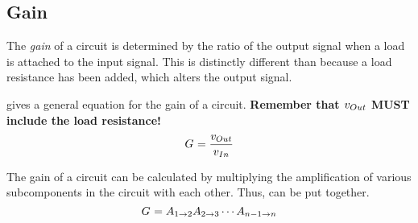\subsection{Gain}\label{subsec:Gain}
The \emph{gain} of a circuit is determined by the ratio of the output signal when a load is attached to the input signal.
This is distinctly different than  because a load resistance has been added, which alters the output signal.

 gives a general equation for the gain of a circuit.
\textbf{Remember that $\ACVoltage{\Out}$ MUST include the load resistance!}
\begin{equation}\label{eq:Gain}
  \Gain{} = \frac{\ACVoltage{\Out}}{\ACVoltage{\In}}
\end{equation}

The gain of a circuit can be calculated by multiplying the amplification of various subcomponents in the circuit with each other.
Thus,  can be put together.
\begin{equation}\label{eq:Gain-Broken}
  G_{} = A_{1 \to 2} A_{2 \to 3} \cdots A_{n-1 \to n}
\end{equation}

